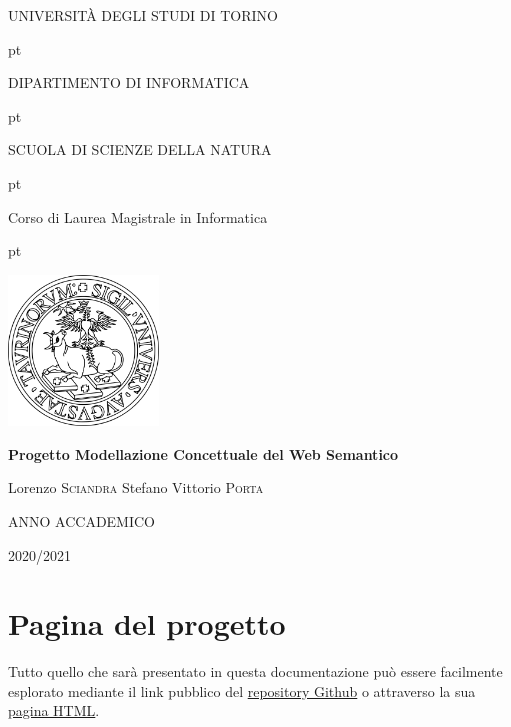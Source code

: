 \documentclass[12pt]{article}
\begin{document}
\begin{titlepage}

\thispagestyle{empty}

\centerline {\Large{\MakeUppercase{ Università DEGLI STUDI DI TORINO}}}
 pt

\centerline {\Large{\textsc DIPARTIMENTO DI INFORMATICA}}

 pt

\centerline {{\textsc SCUOLA DI SCIENZE DELLA NATURA}}

 pt

\centerline {\Large{\textsc Corso di Laurea Magistrale in Informatica}}

 pt


\centerline {\includegraphics[width=4cm]{files/Unito-logo.png}}

\vskip 2cm

\centerline {\Large {\bf Progetto Modellazione Concettuale del Web Semantico}}

\vskip 1.7cm

\noindent Lorenzo \textsc{Sciandra}
\hfill  {Stefano Vittorio \textsc{Porta}}



\vskip 2.7cm


\centerline{ANNO ACCADEMICO}
\vskip 0.1cm
\centerline{2020/2021}

\end{titlepage}

\section{Pagina del progetto}
Tutto quello che sarà presentato in questa documentazione può essere facilmente esplorato mediante il link pubblico del \href{https://github.com/LorenzoSciandra/DeliveryDoctor}{repository Github} o attraverso la sua \href{https://lorenzosciandra.github.io/DeliveryDoctor/}{pagina HTML}.  
\end{document}

